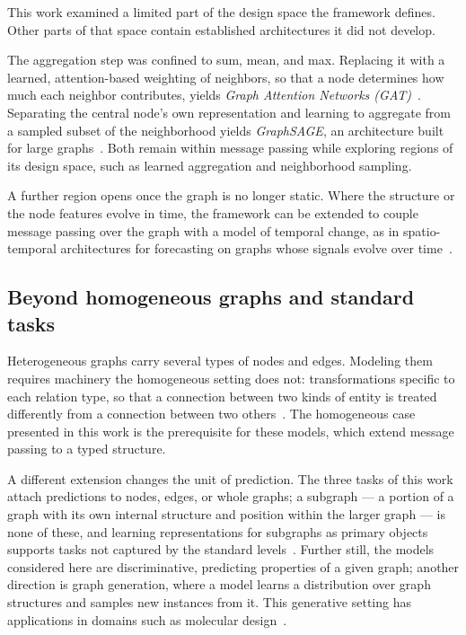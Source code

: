 This work examined a limited part of the design space the framework defines.
Other parts of that space contain established architectures it did not develop.

The aggregation step was confined to sum, mean, and max. Replacing it with a
learned, attention-based weighting of neighbors, so that a node determines how much each
neighbor contributes, yields \textit{Graph Attention Networks (GAT)}~\cite[-3.5pc]{velickovic2018}.
Separating the central node's own representation and learning to aggregate from a
sampled subset of the neighborhood yields \textit{GraphSAGE}, an architecture
built for large graphs~\cite{hamilton2017}. Both remain within 
message passing while exploring regions of its design space, such as learned aggregation 
and neighborhood sampling.

A further region opens once the graph is no longer static. Where the structure
or the node features evolve in time, the framework can be extended to couple message
passing over the graph with a model of temporal change, as in spatio-temporal architectures 
for forecasting on graphs whose signals evolve over time~\cite{yu2018}.

\subsection{Beyond homogeneous graphs and standard tasks}
\label{sec:future-domains}

Heterogeneous graphs carry several types of nodes and edges. 
Modeling them requires machinery the homogeneous setting does not: 
transformations specific to each relation type, so that a connection between 
two kinds of entity is treated differently from a connection between 
two others~\cite{schlichtkrull2018}. The homogeneous case presented in this work 
is the prerequisite for these models, which extend message passing to a typed structure.

A different extension changes the unit of prediction. The three tasks of this
work attach predictions to nodes, edges, or whole graphs; a subgraph --- a
portion of a graph with its own internal structure and position within
the larger graph --- is none of these, and learning representations for
subgraphs as primary objects supports tasks 
not captured by the standard levels~\cite{alsentzer2020}. 
Further still, the models considered here are discriminative, predicting properties 
of a given graph; another direction is graph generation, where a model learns a 
distribution over graph structures and samples new instances from it. This 
generative setting has applications in domains such as molecular design~\cite[1pc]{you2018}.

